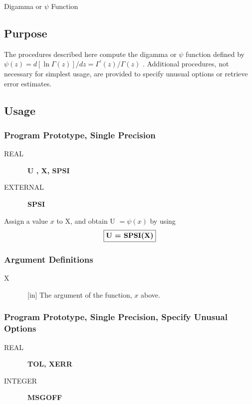 \documentclass[twoside]{MATH77}
\begin{document}
 Digamma or $\psi $ Function


\subsection{Purpose}

The procedures described here compute the digamma or $\psi $ function
defined by $\psi (z) = d[\ln \Gamma (z)]/dz = \Gamma ^{\prime}(z)/\Gamma (z)$%
. Additional procedures, not necessary for simplest usage, are provided to
specify unusual options or retrieve error estimates.

\subsection{Usage}

\subsubsection{Program Prototype, Single Precision}

\begin{description}
\item[REAL]  \ {\bf U , X, SPSI}

\item[EXTERNAL]  \ {\bf SPSI}
\end{description}

Assign a value $x$ to X, and obtain U $= \psi (x)$ by using
$$
\fbox{{\bf U = SPSI(X)}}
$$

\subsubsection{Argument Definitions}

\begin{description}
\item[X]  \ [in] The argument of the function, $x$ above.
\end{description}

\subsubsection{Program Prototype, Single Precision, Specify Unusual Options}

\begin{description}
\item[REAL]  \ {\bf TOL, XERR}

\item[INTEGER]  \ {\bf MSGOFF}
\end{description}
\end{document}
